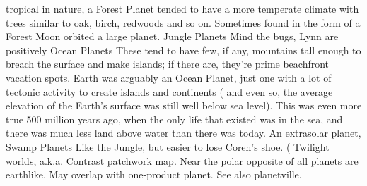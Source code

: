 \documentclass[12pt]{book}
\begin{document}
tropical in nature, a Forest Planet tended to have a more temperate climate with trees similar to oak, birch, redwoods and so on. Sometimes found in the form of a Forest Moon orbited a large planet. Jungle Planets  Mind the bugs, Lynn are positively Ocean Planets  These tend to have few, if any, mountains tall enough to breach the surface and make islands; if there are, they're prime beachfront vacation spots. Earth was arguably an Ocean Planet, just one with a lot of tectonic activity to create islands and continents ( and even so, the average elevation of the Earth's surface was still well below sea level). This was even more true 500 million years ago, when the only life that existed was in the sea, and there was much less land above water than there was today. An extrasolar planet, Swamp Planets  Like the Jungle, but easier to lose Coren's shoe. (  Twilight worlds, a.k.a. Contrast patchwork map. Near the polar opposite of all planets are earthlike. May overlap with one-product planet. See also planetville.
\end{document}
